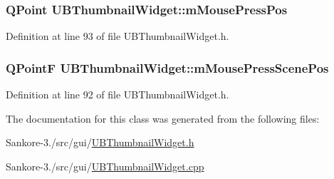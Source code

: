 \hypertarget{class_u_b_thumbnail_widget_a5b2e42091aab49f061b55e4104527a37}{
\subsubsection[{m\-Mouse\-Press\-Pos}]{\setlength{\rightskip}{0pt plus 5cm}Q\-Point U\-B\-Thumbnail\-Widget\-::m\-Mouse\-Press\-Pos\hspace{0.3cm}{\ttfamily [protected]}}}\label{d2/d7e/class_u_b_thumbnail_widget_a5b2e42091aab49f061b55e4104527a37}


Definition at line 93 of file U\-B\-Thumbnail\-Widget.\-h.

\hypertarget{class_u_b_thumbnail_widget_a672d69b425d9a95f6412716ef85444be}{
\subsubsection[{m\-Mouse\-Press\-Scene\-Pos}]{\setlength{\rightskip}{0pt plus 5cm}Q\-Point\-F U\-B\-Thumbnail\-Widget\-::m\-Mouse\-Press\-Scene\-Pos\hspace{0.3cm}{\ttfamily [protected]}}}\label{d2/d7e/class_u_b_thumbnail_widget_a672d69b425d9a95f6412716ef85444be}


Definition at line 92 of file U\-B\-Thumbnail\-Widget.\-h.



The documentation for this class was generated from the following files\-:\begin{DoxyCompactItemize}
\item 
Sankore-\/3./src/gui/\hyperlink{_u_b_thumbnail_widget_8h}{U\-B\-Thumbnail\-Widget.\-h}\item 
Sankore-\/3./src/gui/\hyperlink{_u_b_thumbnail_widget_8cpp}{U\-B\-Thumbnail\-Widget.\-cpp}\end{DoxyCompactItemize}
